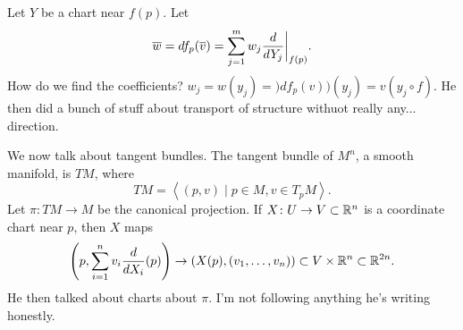 Let $Y$ be a chart near $f(p)$. Let
\[ \overline w = df_p(\overline v) = \sum_{j=1}^m w_j \frac{d}{dY_j}\biggr\rvert_{f(p)}. \]
How do we find the coefficients? $w_j = w(y_j) = )d f_p (v))(y_j) = v(y_j \circ f)$. He then did a bunch of stuff about transport of structure withuot really any... direction.

We now talk about tangent bundles. The tangent bundle of $M^n$, a smooth manifold, is $TM$, where
\[ TM = \left<(p, v) \mid p \in M, v \in T_p M\right>. \]
Let $\pi \colon TM \to M$ be the canonical projection. If $X \colon U \to V \subset \mathbb R^n$ is a coordinate chart near $p$, then $X$ maps
\[ \left(p, \sum_{i=1}^n v_i \frac{d}{dX_i}(p)\right) \to (X(p), (v_1, \dots, v_n)) \subset V \times \mathbb R^n \subset \mathbb R^{2n}. \]
He then talked about charts about $\pi$. I'm not following anything he's writing honestly.